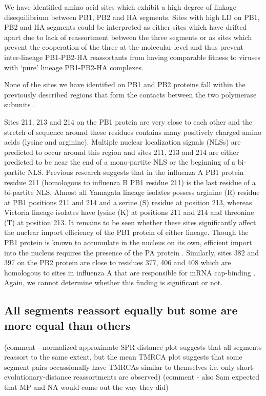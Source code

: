 \documentclass[11pt,oneside,letterpaper]{article}
\begin{document}
We have identified amino acid sites which exhibit a high degree of linkage disequilibrium between PB1, PB2 and HA segments.
Sites with high LD on PB1, PB2 and HA segments could be interpreted as either sites which have drifted apart due to lack of reassortment between the three segments or as sites which prevent the cooperation of the three at the molecular level and thus prevent inter-lineage PB1-PB2-HA reassortants from having comparable fitness to viruses with `pure' lineage PB1-PB2-HA complexes.

None of the sites we have identified on PB1 and PB2 proteins fall within the previously described regions that form the contacts between the two polymerase subunits \cite{sugiyama2009}.

Sites 211, 213 and 214 on the PB1 protein are very close to each other and the stretch of sequence around these residues contains many positively charged amino acids (lysine and arginine).
Multiple nuclear localization signals (NLSs) are predicted to occur around this region and sites 211, 213 and 214 are either predicted to be near the end of a mono-partite NLS or the beginning of a bi-partite NLS.
Previous research \cite{nath1990} suggests that in the influenza A PB1 protein residue 211 (homologous to influenza B PB1 residue 211) is the last residue of a bi-partite NLS.
Almost all Yamagata lineage isolates possess arginine (R) residue at PB1 positions 211 and 214 and a serine (S) residue at position 213, whereas Victoria lineage isolates have lysine (K) at positions 211 and 214 and threonine (T) at position 213.
It remains to be seen whether these sites significantly affect the nuclear import efficiency of the PB1 protein of either lineage.
Though the PB1 protein is known to accumulate in the nucleus on its own, efficient import into the nucleus requires the presence of the PA protein \cite{fodor2004}.
Similarly, sites 382 and 397 on the PB2 protein are close to residues 377, 406 and 408 which are homologous to sites in influenza A that are responsible for mRNA cap-binding \cite{guilligay2008}.
Again, we cannot determine whether this finding is significant or not.


\subsection*{All segments reassort equally but some are more equal than others}
(comment - normalized approximate SPR distance plot suggests that all segments reassort to the same extent, but the mean \Delta TMRCA plot suggests that some segment pairs occassionally have TMRCAs similar to themselves i.e. only short-evolutionary-distance reassortments are observed)
(comment - also Sam expected that MP and NA would come out the way they did)
\end{document}
